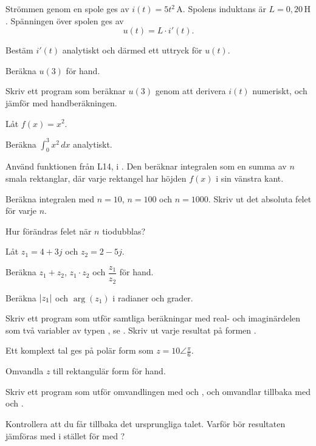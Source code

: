 Strömmen genom en spole ges av $i(t) = 5t^2\,\text{A}$. Spolens induktans är
$L = 0{,}20\,\text{H}$. Spänningen över spolen ges av
\[
  u(t) = L \cdot i'(t).
\]
\begin{parts}
  \item Bestäm $i'(t)$ analytiskt och därmed ett uttryck för $u(t)$.
  \item Beräkna $u(3)$ för hand.
  \item Skriv ett program som beräknar $u(3)$ genom att derivera $i(t)$ numeriskt, och jämför
    med handberäkningen.
\end{parts}

Låt $f(x) = x^2$.
\begin{parts}
  \item Beräkna $\int_0^3 x^2\,dx$ analytiskt.
  \item Använd funktionen  från L14, i
    . Den beräknar integralen som en summa av $n$ smala
    rektanglar, där varje rektangel har höjden $f(x)$ i sin vänstra kant.
  \item Beräkna integralen med $n = 10$, $n = 100$ och $n = 1000$. Skriv ut det absoluta felet
    för varje $n$.
  \item Hur förändras felet när $n$ tiodubblas?
\end{parts}



Låt $z_1 = 4 + 3j$ och $z_2 = 2 - 5j$.
\begin{parts}
  \item Beräkna $z_1 + z_2$, $z_1 \cdot z_2$ och $\dfrac{z_1}{z_2}$ för hand.
  \item Beräkna $\lvert z_1\rvert$ och $\arg(z_1)$ i radianer och grader.
  \item Skriv ett program som utför samtliga beräkningar med real- och imaginärdelen som två
    variabler av typen , se . Skriv ut varje resultat på
    formen .
\end{parts}

Ett komplext tal ges på polär form som $z = 10\angle\frac{\pi}{6}$.
\begin{parts}
  \item Omvandla $z$ till rektangulär form för hand.
  \item Skriv ett program som utför omvandlingen med  och , och omvandlar
    tillbaka med  och .
  \item Kontrollera att du får tillbaka det ursprungliga talet. Varför bör resultaten jämföras med
     i stället för med \code{==}?
\end{parts}

